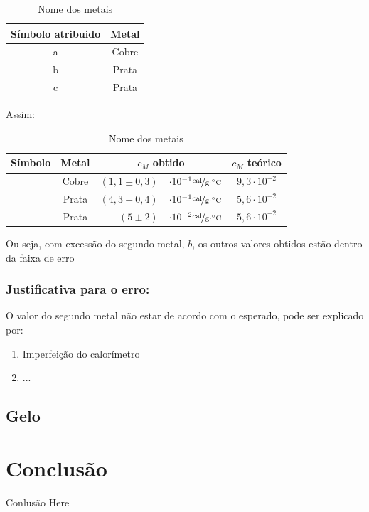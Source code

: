 \documentclass[a4paper]{article}
\providecommand{\tabularnewline}{\\}
\providecommand{\tabularnewline}{\\} %
\begin{document}
				\begin{table}[!ht]
					\caption{Nome dos metais}

					\centering{}%
					\begin{tabular}{|c|c|}
					\hline Símbolo atribuido & Metal\tabularnewline
					\hline a & Cobre\tabularnewline
					\hline b & Prata\tabularnewline
					\hline c & Prata\tabularnewline \hline 
					\end{tabular}
				\end{table}


				Assim:

				\begin{table}[!ht]
					\caption{Nome dos metais}

					\centering{}%
					\begin{tabular}{|c|c|rl|c|}
						\hline  Símbolo &             Metal         &           \multicolumn{2}{c|}{$c_{M}$ obtido} & $c_{M}$ teórico\tabularnewline
						\hline  & Cobre & $\left(1,1\pm0,3\right)$  & $\cdot10^{-1}\unitfrac{cal}{g\cdot^{\circ}C}$ & $9,3\cdot10^{-2}$\tabularnewline
						\hline  & Prata & $\left(4,3\pm0,4\right)$  & $\cdot10^{-1}\unitfrac{cal}{g\cdot^{\circ}C}$ & $5,6\cdot10^{-2}$\tabularnewline
						\hline  & Prata &     $\left(5\pm2\right)$  & $\cdot10^{-2}\unitfrac{cal}{g\cdot^{\circ}C}$ & $5,6\cdot10^{-2}$\tabularnewline
						\hline 
					\end{tabular}
				\end{table}


				Ou seja, com excessão do segundo metal, $b$, os outros valores obtidos
				estão dentro da faixa de erro


			\subsubsection{Justificativa para o erro:}

				O valor do segundo metal não estar de acordo com o esperado, pode
				ser explicado por:
				\begin{enumerate}
					\item Imperfeição do calorímetro
					\item ...
				\end{enumerate}

		\subsection{Gelo}


	\section{Conclusão}

	Conlusão Here 
\end{document}
